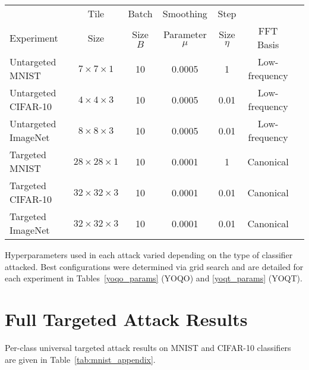 \documentclass[letterpaper]{article}
\begin{document}
	\begin{table*}[t]
		\centering
		\begin{tabular}{lcccccc}
			\toprule
			& Tile & Batch  & Smoothing  &  Step   \\
			Experiment & Size & Size $B$ & Parameter $\mu$ & Size $\eta$ & FFT Basis \\
			\midrule
			Untargeted MNIST      & $7 \times 7 \times 1$   & 10 & 0.0005 & 1     & Low-frequency \\
			Untargeted CIFAR-10   & $4 \times 4 \times 3$   & 10 & 0.0005 & 0.01  & Low-frequency \\ 
			Untargeted ImageNet   & $8 \times 8 \times 3$   & 10 & 0.0005 & 0.01  & Low-frequency \\ 
			Targeted MNIST        & $28 \times 28 \times 1$ & 10 & 0.0001 & 1     & Canonical \\
			Targeted CIFAR-10     & $32 \times 32 \times 3$ & 10 & 0.0001 & 0.01  & Canonical\\ 
			Targeted ImageNet     & $32 \times 32 \times 3$ & 10 & 0.0001 & 0.01  & Canonical \\ 
			\bottomrule
		\end{tabular}
		\caption{Hyperparameter configurations used in targeted and untargeted attacks with YOQT.}
		\label{yoqt_params}
	\end{table*}
	
	Hyperparameters used in each attack varied depending on the type of classifier attacked. Best configurations were determined via grid search and are detailed for each experiment in Tables~\ref{yoqo_params} (YOQO) and \ref{yoqt_params} (YOQT).
	
	\newpage
	
	\section{Full Targeted Attack Results}
	
	Per-class universal targeted attack results on MNIST and CIFAR-10 classifiers are given in Table~\ref{tab:mnist_appendix}.
	
\end{document}
